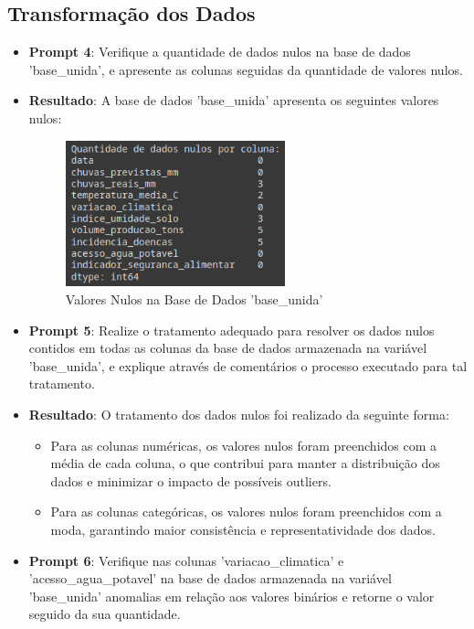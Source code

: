 \documentclass[12pt, a4paper, onecolumn]{article}
\begin{document}
    \subsection*{Transformação dos Dados}
    \begin{itemize}
        \item \textbf{Prompt 4}: Verifique a quantidade de dados nulos na base de dados 'base\_unida', e apresente as colunas seguidas da quantidade de valores nulos.
        \item \textbf{Resultado}: A base de dados 'base\_unida' apresenta os seguintes valores nulos:
        
        \begin{figure}[htbp]
            \centering
            \includegraphics[width=0.6\textwidth]{figures/valores_nulos.png}
            \caption{Valores Nulos na Base de Dados 'base\_unida'}
        \end{figure}

        \item \textbf{Prompt 5}: Realize o tratamento adequado para resolver os dados nulos contidos em todas as colunas da base de dados armazenada na variável 'base\_unida', e explique através de comentários o processo executado para tal tratamento.
        \item \textbf{Resultado}: O tratamento dos dados nulos foi realizado da seguinte forma:
        \begin{itemize}
            \item Para as colunas numéricas, os valores nulos foram preenchidos com a média de cada coluna, o que contribui para manter a distribuição dos dados e minimizar o impacto de possíveis outliers.
            \item Para as colunas categóricas, os valores nulos foram preenchidos com a moda, garantindo maior consistência e representatividade dos dados.
        \end{itemize}

        \item \textbf{Prompt 6}: Verifique nas colunas 'variacao\_climatica' e 'acesso\_agua\_potavel' na base de dados armazenada na variável 'base\_unida' anomalias em relação aos valores binários e retorne o valor seguido da sua quantidade.
        

\end{itemize}
\end{document}

